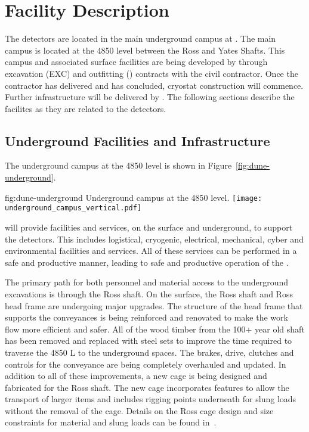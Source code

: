 \chapter{Facility Description}
\label{vl:tc-facility}

The  detectors are located in the main underground campus
at . The main campus is located at the 4850 level between
the Ross and Yates Shafts. This campus and associated surface
facilities are being developed by  through excavation
(EXC) and outfitting () contracts with the civil
contractor. Once the contractor has delivered and  has
concluded, cryostat construction will commence. Further infrastructure
will be delivered by .  The following sections describe
the facilites as they are related to the  detectors.

\section{Underground Facilities and Infrastructure}
\label{sec:fdsp-coord-uderground-excavation}

The  underground campus at the  4850 level is shown in
Figure~\ref{fig:dune-underground}.
\begin{dunefigure}{fig:dune-underground}
  {Underground campus at the 4850 level.}
  \texttt{[image: underground\_campus\_vertical.pdf]}
\end{dunefigure}
 will provide facilities and services, on the surface and
underground, to support the  detectors.  This includes
logistical, cryogenic, electrical, mechanical, cyber and environmental
facilities and services.  All of these services %
can be performed  in
a safe and productive manner, leading to safe and productive operation of the .

The primary path for both personnel and material access to the
underground excavations is through the Ross shaft. On the surface, the
Ross shaft and Ross head frame are undergoing major upgrades. The
structure of the head frame that supports the conveyances is being
reinforced and renovated to make the work flow more efficient and
safer.  All of the wood timber from the 100+ year old shaft has been
removed and replaced with steel sets to improve the time required to
traverse the 4850 L to the underground spaces.  The brakes, drive,
clutches and controls for the conveyance are being completely
overhauled and updated.  In addition to all of these improvements, a
new cage is being designed and fabricated for the Ross shaft.  The new
cage incorporates features to allow the transport of larger items and
includes rigging points underneath for slung loads without the removal
of the cage.  Details on the Ross cage design and size constraints for
material and slung loads can be found in~.


